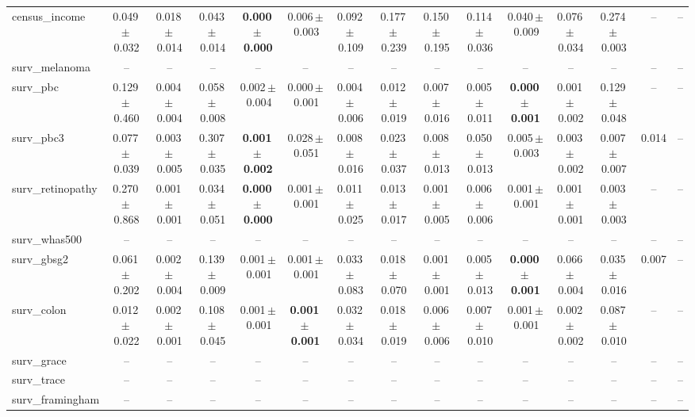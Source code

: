\documentclass[8pt]{extarticle}
\begin{document}
\begin{longtable}{l*{14}{c}}
census\_income & 0.049\,$\pm$\,0.032 & 0.018\,$\pm$\,0.014 & 0.043\,$\pm$\,0.014 & \textbf{0.000\,$\pm$\,0.000} & 0.006\,$\pm$\,0.003 & 0.092\,$\pm$\,0.109 & 0.177\,$\pm$\,0.239 & 0.150\,$\pm$\,0.195 & 0.114\,$\pm$\,0.036 & 0.040\,$\pm$\,0.009 & 0.076\,$\pm$\,0.034 & 0.274\,$\pm$\,0.003 & -- & -- \\
surv\_melanoma & -- & -- & -- & -- & -- & -- & -- & -- & -- & -- & -- & -- & -- & -- \\
surv\_pbc & 0.129\,$\pm$\,0.460 & 0.004\,$\pm$\,0.004 & 0.058\,$\pm$\,0.008 & 0.002\,$\pm$\,0.004 & 0.000\,$\pm$\,0.001 & 0.004\,$\pm$\,0.006 & 0.012\,$\pm$\,0.019 & 0.007\,$\pm$\,0.016 & 0.005\,$\pm$\,0.011 & \textbf{0.000\,$\pm$\,0.001} & 0.001\,$\pm$\,0.002 & 0.129\,$\pm$\,0.048 & -- & -- \\
surv\_pbc3 & 0.077\,$\pm$\,0.039 & 0.003\,$\pm$\,0.005 & 0.307\,$\pm$\,0.035 & \textbf{0.001\,$\pm$\,0.002} & 0.028\,$\pm$\,0.051 & 0.008\,$\pm$\,0.016 & 0.023\,$\pm$\,0.037 & 0.008\,$\pm$\,0.013 & 0.050\,$\pm$\,0.013 & 0.005\,$\pm$\,0.003 & 0.003\,$\pm$\,0.002 & 0.007\,$\pm$\,0.007 & 0.014 & -- \\
surv\_retinopathy & 0.270\,$\pm$\,0.868 & 0.001\,$\pm$\,0.001 & 0.034\,$\pm$\,0.051 & \textbf{0.000\,$\pm$\,0.000} & 0.001\,$\pm$\,0.001 & 0.011\,$\pm$\,0.025 & 0.013\,$\pm$\,0.017 & 0.001\,$\pm$\,0.005 & 0.006\,$\pm$\,0.006 & 0.001\,$\pm$\,0.001 & 0.001\,$\pm$\,0.001 & 0.003\,$\pm$\,0.003 & -- & -- \\
surv\_whas500 & -- & -- & -- & -- & -- & -- & -- & -- & -- & -- & -- & -- & -- & -- \\
surv\_gbsg2 & 0.061\,$\pm$\,0.202 & 0.002\,$\pm$\,0.004 & 0.139\,$\pm$\,0.009 & 0.001\,$\pm$\,0.001 & 0.001\,$\pm$\,0.001 & 0.033\,$\pm$\,0.083 & 0.018\,$\pm$\,0.070 & 0.001\,$\pm$\,0.001 & 0.005\,$\pm$\,0.013 & \textbf{0.000\,$\pm$\,0.001} & 0.066\,$\pm$\,0.004 & 0.035\,$\pm$\,0.016 & 0.007 & -- \\
surv\_colon & 0.012\,$\pm$\,0.022 & 0.002\,$\pm$\,0.001 & 0.108\,$\pm$\,0.045 & 0.001\,$\pm$\,0.001 & \textbf{0.001\,$\pm$\,0.001} & 0.032\,$\pm$\,0.034 & 0.018\,$\pm$\,0.019 & 0.006\,$\pm$\,0.006 & 0.007\,$\pm$\,0.010 & 0.001\,$\pm$\,0.001 & 0.002\,$\pm$\,0.002 & 0.087\,$\pm$\,0.010 & -- & -- \\
surv\_grace & -- & -- & -- & -- & -- & -- & -- & -- & -- & -- & -- & -- & -- & -- \\
surv\_trace & -- & -- & -- & -- & -- & -- & -- & -- & -- & -- & -- & -- & -- & -- \\
surv\_framingham & -- & -- & -- & -- & -- & -- & -- & -- & -- & -- & -- & -- & -- & -- \\

\end{longtable}
\end{document}
